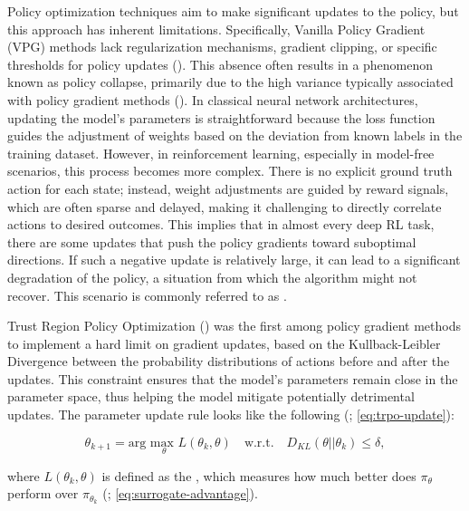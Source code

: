 \noindent Policy optimization techniques aim to make significant updates to the policy, but this approach has inherent limitations. Specifically, Vanilla Policy Gradient (VPG) methods lack regularization mechanisms, gradient clipping, or specific thresholds for policy updates (\textcolor{deepblue}{\cite{SpinningUp2018}}). This absence often results in a phenomenon known as policy collapse, primarily due to the high variance typically associated with policy gradient methods (\textcolor{deepblue}{\cite{dohare2023overcoming}}). In classical neural network architectures, updating the model’s parameters is straightforward because the loss function guides the adjustment of weights based on the deviation from known labels in the training dataset. However, in reinforcement learning, especially in model-free scenarios, this process becomes more complex. There is no explicit ground truth action for each state; instead, weight adjustments are guided by reward signals, which are often sparse and delayed, making it challenging to directly correlate actions to desired outcomes. This implies that in almost every deep RL task, there are some updates that push the policy gradients toward suboptimal directions. If such a negative update is relatively large, it can lead to a significant degradation of the policy, a situation from which the algorithm might not recover. This scenario is commonly referred to as .

\bigskip

\noindent Trust Region Policy Optimization (\textcolor{deepblue}{\cite{schulman2017trust}}) was the first among policy gradient methods to implement a hard limit on gradient updates, based on the Kullback-Leibler Divergence between the probability distributions of actions before and after the updates. This constraint ensures that the model's parameters remain close in the parameter space, thus helping the model mitigate potentially detrimental updates. The parameter update rule looks like the following (\textcolor{deepblue}{\cite{schulman2017trust}; \autoref{eq:trpo-update}}):

\begin{equation}
    \theta_{k+1} = \text{arg }\underset{\theta}{\text{max }} L(\theta_k, \theta) \quad \text{w.r.t.} \quad D_{KL}(\theta || \theta_k) \leq \delta,
    \label{eq:trpo-update}
\end{equation}

\noindent where $L(\theta_k, \theta)$ is defined as the , which measures how much better does $\pi_{\theta}$ perform over $\pi_{\theta_k}$ (\textcolor{deepblue}{\cite{schulman2017trust}; \autoref{eq:surrogate-advantage}}).

